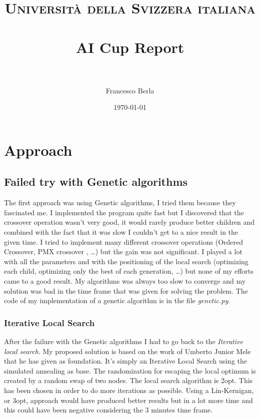 \documentclass[paper=a4, fontsize=11pt]{scrartcl} %
\title{	
\normalfont \normalsize 
\textsc{Universit\`a della Svizzera italiana} \\ [25pt] %
\horrule{0.5pt} \\[0.4cm] %
\huge AI Cup Report \\ %
\horrule{2pt} \\[0.5cm] %
}
\author{Francesco Berla} %
\date{\normalsize\today} %
\numberwithin{equation}{section} %
\numberwithin{figure}{section} %
\numberwithin{table}{section} %
\begin{document}
\maketitle %


\section{Approach}

\subsection{Failed try with Genetic algorithms}

The first approach was using Genetic algorithms, I tried them because they fascinated me.
I implemented the program quite fast but I discovered that the crossover operation wasn't very good, it would rarely produce better children and combined with the fact that it was slow I couldn't get to a nice result in the given time.
I tried to implement many different crossover operations (Ordered Crossover,
PMX crossover \cite{oluk_2002}, \dots) but the gain was not significant.
I played a lot with all the parameters and with the positioning of the local search (optimizing each child, optimizing only the best of each generation, \dots) but none of my efforts came to a good result.
My algorithms was always too slow to converge and my solution was bad in the time frame that was given for solving the problem.
The code of my implementation of a genetic algorithm is in the file \emph{genetic.py}.


\subsubsection{Iterative Local Search}

After the failure with the Genetic algorithms I had to go back to the \emph{Iterative local search}.
My proposed solution is based on the work of Umberto Junior Mele that he has given as foundation.
It's simply an Iterative Local Search using the simulated annealing as base.
The randomization for escaping the local optimum is created by a random swap of two nodes.
The local search algorithm is 2opt.
This has been chosen in order to do more iterations as possible.
Using a Lin-Kernigan, or 3opt, approach would have produced better results but in a lot more time and this could have been negative considering the 3 minutes time frame.
\end{document}
